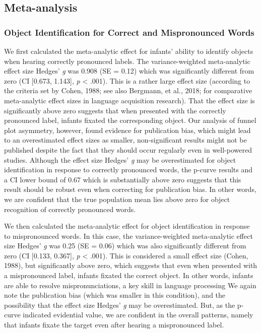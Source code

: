\documentclass[man]{apa6}
\theoremstyle{definition}
\theoremstyle{definition}
\theoremstyle{definition}
\theoremstyle{remark}
\begin{document}
\subsection{Meta-analysis}\label{meta-analysis-1}

\subsubsection{Object Identification for Correct and Mispronounced
Words}\label{object-identification-for-correct-and-mispronounced-words}

We first calculated the meta-analytic effect for infants' ability to
identify objects when hearing correctly pronounced labels. The
variance-weighted meta-analytic effect size Hedges' \emph{g} was 0.908
(SE = 0.12) which was significantly different from zero (CI {[}0.673,
1.143{]}, \emph{p} \textless{} .001). This is a rather large effect size
(according to the criteria set by Cohen, 1988; see also Bergmann, et
al., 2018; for comparative meta-analytic effect sizes in language
acquisition research). That the effect size is significantly above zero
suggests that when presented with the correctly pronounced label,
infants fixated the corresponding object. Our analysis of funnel plot
asymmetry, however, found evidence for publication bias, which might
lead to an overestimated effect sizes as smaller, non-significant
results might not be published despite the fact that they should occur
regularly even in well-powered studies. Although the effect size Hedges'
\emph{g} may be overestimated for object identification in response to
correctly pronounced words, the p-curve results and a CI lower bound of
0.67 which is substantially above zero suggests that this result should
be robust even when correcting for publication bias. In other words, we
are confident that the true population mean lies above zero for object
recognition of correctly pronounced words.

We then calculated the meta-analytic effect for object identification in
response to mispronounced words. In this case, the variance-weighted
meta-analytic effect size Hedges' \emph{g} was 0.25 (SE = 0.06) which
was also significantly different from zero (CI {[}0.133, 0.367{]},
\emph{p} \textless{} .001). This is considered a small effect size
(Cohen, 1988), but significantly above zero, which suggests that even
when presented with a mispronounced label, infants fixated the correct
object. In other words, infants are able to resolve mispronunciations, a
key skill in language processing We again note the publication bias
(which was smaller in this condition), and the possibility that the
effect size Hedges' \emph{g} may be overestimated. But, as the p-curve
indicated evidential value, we are confident in the overall patterns,
namely that infants fixate the target even after hearing a mispronounced
label.
\end{document}
